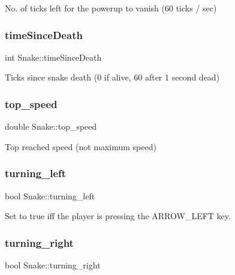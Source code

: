 No. of ticks left for the powerup to vanish (60 ticks / sec) 

\mbox{\label{group__snake_gad5771c4485a61c0bbbc101ce0b1fe81f}} 
\subsubsection{\texorpdfstring{time\+Since\+Death}{timeSinceDeath}}
{\footnotesize\ttfamily int Snake\+::time\+Since\+Death}



Ticks since snake death (0 if alive, 60 after 1 second dead) 

\mbox{\label{group__snake_ga26df95d629329c163a1153f81e1c8b17}} 
\subsubsection{\texorpdfstring{top\+\_\+speed}{top\_speed}}
{\footnotesize\ttfamily double Snake\+::top\+\_\+speed}



Top reached speed (not maximum speed) 

\mbox{\label{group__snake_ga2c1982167b9cfb8ead89775dbef75be3}} 
\subsubsection{\texorpdfstring{turning\+\_\+left}{turning\_left}}
{\footnotesize\ttfamily bool Snake\+::turning\+\_\+left}



Set to true iff the player is pressing the A\+R\+R\+O\+W\+\_\+\+L\+E\+FT key. 

\mbox{\label{group__snake_ga3c8626bc3f65ba80fb852c3cfeaf356c}} 
\subsubsection{\texorpdfstring{turning\+\_\+right}{turning\_right}}
{\footnotesize\ttfamily bool Snake\+::turning\+\_\+right}




